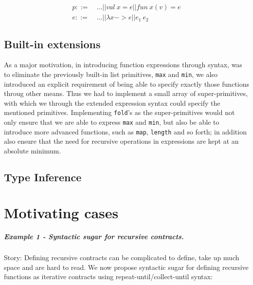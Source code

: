 \documentclass[10pt,a4paper,final,oneside,openany,article]{memoir}
\begin{document}
\begin{align}
  p ::= &\ \ldots || val~x = e || fun~ x (v) = e \\
  e ::= &\ \ldots || \lambda x -> e || e_1\ e_2
\end{align}

\section{Built-in extensions}
As a major motivation, in introducing function expressions through
syntax, was to eliminate the previously built-in list primitives,
\lstinline{max} and \lstinline{min}, we also introduced an explicit
requirement of being able to specify exactly those functions throug
other means. Thus we had to implement a small array of super-primitives,
with which we through the extended expression syntax could specify the
mentioned primitives. Implementing \lstinline{fold}'s as the
super-primitives would not only ensure that we are able to express 
\lstinline{max} and \lstinline{min}, but also be able to introduce more
advanced functions, such as \lstinline{map}, \lstinline{length} and so 
forth; in addition also ensure that the need for recursive operations
in expressions are kept at an absolute minimum.


\section{Type Inference}


\printbibliography

\appendix

\chapter{Motivating cases}

\paragraph{Example 1 - Syntactic sugar for recursive contracts.}
Story: Defining recursive contracts can be complicated to define, take
up much space and are hard to read. We now propose syntactic sugar for
defining recursive functions as iterative contracts using
repeat-until/collect-until syntax:
\end{document}
